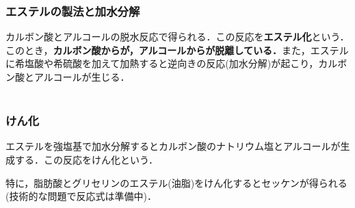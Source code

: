 \documentclass[a4paper,12pt]{ltjsreport}
\begin{document}
\subsubsection*{エステルの製法と加水分解}
カルボン酸とアルコールの脱水反応で得られる．この反応を{\color{red}\textbf{エステル化}}という．このとき，{\color{red}\textbf{カルボン酸からが，アルコールからが脱離している．}}また，エステルに希塩酸や希硫酸を加えて加熱すると逆向きの反応({\color{red}加水分解})が起こり，カルボン酸とアルコールが生じる．\\　
{\centerline{}}
\newpage
\subsubsection*{けん化}
エステルを強塩基で加水分解するとカルボン酸のナトリウム塩とアルコールが生成する．この反応を{\color{red}けん化}という．\\
 {\centerline{}}
 特に，脂肪酸とグリセリンのエステル(油脂)をけん化するとセッケンが得られる(技術的な問題で反応式は準備中)．
\end{document}
